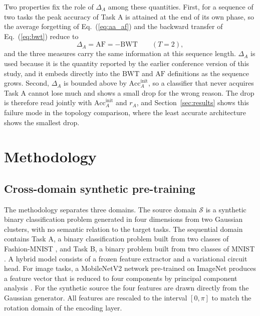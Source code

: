 \documentclass[preprint,number,sort&compress]{elsarticle}
\begin{document}
Two properties fix the role of $\Delta_A$ among these quantities. First, for
a sequence of two tasks the peak accuracy of Task A is attained at the end of
its own phase, so the average forgetting of Eq.~(\ref{eq:aa_af}) and the
backward transfer of Eq.~(\ref{eq:bwt}) reduce to
\begin{equation}
  \Delta_A = \mathrm{AF} = -\mathrm{BWT} \qquad (T = 2),
  \label{eq:delta_identity}
\end{equation}
and the three measures carry the same information at this sequence length.
$\Delta_A$ is used because it is the quantity reported by the earlier
conference version of this study, and it embeds directly into the
$\mathrm{BWT}$ and $\mathrm{AF}$ definitions as the sequence grows. Second,
$\Delta_A$ is bounded above by $\mathrm{Acc}_A^{\text{init}}$, so a
classifier that never acquires Task A cannot lose much and shows a small
drop for the wrong reason. The drop is therefore read jointly with
$\mathrm{Acc}_A^{\text{init}}$ and $r_A$, and
Section~\ref{sec:results} shows this failure mode in the topology
comparison, where the least accurate architecture shows the smallest drop.

\section{Methodology}
\label{sec:methodology}

\subsection{Cross-domain synthetic pre-training}

The methodology separates three domains. The source domain $\mathcal{S}$ is
a synthetic binary classification problem generated in four dimensions from
two Gaussian clusters, with no semantic relation to the target tasks. The
sequential domain contains Task A, a binary classification problem built
from two classes of Fashion-MNIST \cite{Xiao17}, and Task B, a binary
problem built from two classes of MNIST \cite{Lecun98}. A hybrid model
consists of a frozen feature extractor and a variational circuit head. For
image tasks, a MobileNetV2 network pre-trained on ImageNet produces a
feature vector that is reduced to four components by principal component
analysis \cite{Sandler18, pearson1901lines}. For the synthetic source the
four features are drawn directly from the Gaussian generator. All features
are rescaled to the interval $[0, \pi]$ to match the rotation domain of the
encoding layer.
\end{document}
